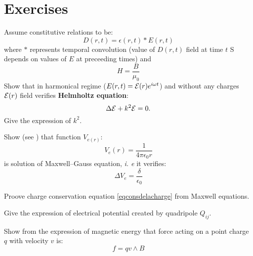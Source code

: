\documentclass[12pt]{book}
\begin{document}
\section{Exercises}

\begin{exo}\label{exoeqhelmoltz}
Assume constitutive relations to be:
\begin{equation}
D(r,t)=\epsilon(r,t) * E(r,t)
\end{equation}
where $*$ represents temporal convolution (value of
$D(r,t)$ field at time $t$ S
depends on values of $E$ at preceeding times) and
\begin{equation}
H=\frac{B}{\mu_0}
\end{equation}
Show that in harmonical regime ($E(r,t)={\cal E}(r)e^{i\omega t}$) and without
any charges ${\cal E}(r)$ field verifies {\bf Helmholtz equation}:
\begin{equation}
\Delta {\cal E}+k^{2}{\cal E}=0.
\end{equation}
Give the expression of $k^{2}$.
\end{exo}

\begin{exo}
Show (see \cite{ma:distr:Schwartz65,ma:distr:Zemanian87}) that function $V_{e(r)}$: 
\begin{equation}
V_e(r)=\frac{1}{4\pi\epsilon_0 r}
\end{equation}
is solution of
Maxwell--Gauss equation, {\it i. e } it verifies:
\begin{equation}
\Delta V_e=\frac{\delta}{\epsilon_0}
\end{equation}
\end{exo}

\begin{exo}
Proove charge conservation equation \ref{eqconsdelacharge} from Maxwell
equations. 
\end{exo}

\begin{exo}
Give the expression of electrical potential created by quadripole $Q_{ij}$.
\end{exo}

\begin{exo}
Show from the expression of magnetic energy that force acting on a point
charge $q$ with velocity $v$ is:
\begin{equation}
f=qv\wedge B
\end{equation}

\end{exo}
\end{document}
